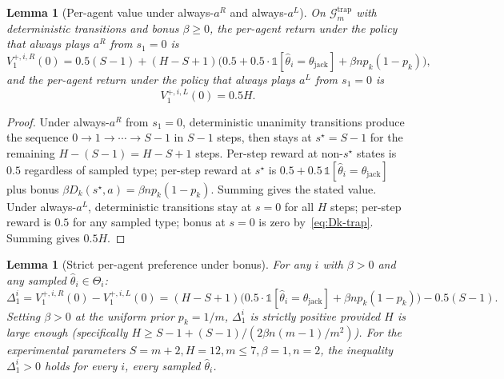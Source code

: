 \documentclass{article}
\newtheorem{lemma}[theorem]{Lemma}
\begin{document}
\begin{lemma}[Per-agent value under always-$a^R$ and always-$a^L$]
\label{lem:value-trajectories}
On $\mathcal{G}_m^{\mathrm{trap}}$ with deterministic transitions and bonus $\beta \geq 0$, the per-agent return under the policy that always plays $a^R$ from $s_1 = 0$ is
\begin{equation}
V^{+, i, R}_1(0) = 0.5(S-1) + (H - S + 1)\big(0.5 + 0.5 \cdot \mathbb{1}[\hat\theta_i = \theta_{\mathrm{jack}}] + \beta n p_k(1 - p_k)\big),
\end{equation}
and the per-agent return under the policy that always plays $a^L$ from $s_1 = 0$ is
\begin{equation}
V^{+, i, L}_1(0) = 0.5 H.
\end{equation}
\end{lemma}

\begin{proof}
Under always-$a^R$ from $s_1 = 0$, deterministic unanimity transitions produce the sequence $0 \to 1 \to \cdots \to S-1$ in $S-1$ steps, then stays at $s^\star = S-1$ for the remaining $H - (S - 1) = H - S + 1$ steps. Per-step reward at non-$s^\star$ states is $0.5$ regardless of sampled type; per-step reward at $s^\star$ is $0.5 + 0.5\,\mathbb{1}[\hat\theta_i = \theta_{\mathrm{jack}}]$ plus bonus $\beta D_k(s^\star, a) = \beta n p_k(1-p_k)$. Summing gives the stated value. Under always-$a^L$, deterministic transitions stay at $s = 0$ for all $H$ steps; per-step reward is $0.5$ for any sampled type; bonus at $s = 0$ is zero by~\eqref{eq:Dk-trap}. Summing gives $0.5 H$.
\end{proof}

\begin{lemma}[Strict per-agent preference under bonus]
\label{lem:preference-bonus}
For any $i$ with $\beta > 0$ and any sampled $\hat\theta_i \in \Theta_i$:
\begin{equation}
\Delta^i_1 = V^{+, i, R}_1(0) - V^{+, i, L}_1(0) = (H - S + 1)\big(0.5 \cdot \mathbb{1}[\hat\theta_i = \theta_{\mathrm{jack}}] + \beta n p_k(1 - p_k)\big) - 0.5(S - 1).
\end{equation}
Setting $\beta > 0$ at the uniform prior $p_k = 1/m$, $\Delta^i_1$ is strictly positive provided $H$ is large enough (specifically $H \geq S - 1 + (S-1) / (2\beta n (m-1)/m^2)$). For the experimental parameters $S = m+2, H = 12, m \leq 7, \beta = 1, n = 2$, the inequality $\Delta^i_1 > 0$ holds for every $i$, every sampled $\hat\theta_i$.
\end{lemma}
\end{document}
